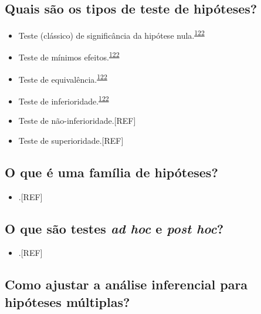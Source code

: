 \documentclass[
  a4paper,
]{book}
\providecommand{\tightlist}{%
  \setlength{\itemsep}{0pt}\setlength{\parskip}{0pt}}
\begin{document}
\hypertarget{quais-suxe3o-os-tipos-de-teste-de-hipuxf3teses}{%
\subsection{Quais são os tipos de teste de hipóteses?}\label{quais-suxe3o-os-tipos-de-teste-de-hipuxf3teses}}

\begin{itemize}
\item
  Teste (clássico) de significância da hipótese nula.\textsuperscript{\protect\hyperlink{ref-lakens2018}{122}}
\item
  Teste de mínimos efeitos.\textsuperscript{\protect\hyperlink{ref-lakens2018}{122}}
\item
  Teste de equivalência.\textsuperscript{\protect\hyperlink{ref-lakens2018}{122}}
\item
  Teste de inferioridade.\textsuperscript{\protect\hyperlink{ref-lakens2018}{122}}
\item
  Teste de não-inferioridade.{[}REF{]}
\item
  Teste de superioridade.{[}REF{]}
\end{itemize}

\hypertarget{o-que-uxe9-uma-famuxedlia-de-hipuxf3teses}{%
\subsection{O que é uma família de hipóteses?}\label{o-que-uxe9-uma-famuxedlia-de-hipuxf3teses}}

\begin{itemize}
\tightlist
\item
  .{[}REF{]}
\end{itemize}

\hypertarget{o-que-suxe3o-testes-ad-hoc-e-post-hoc}{%
\subsection{\texorpdfstring{O que são testes \emph{ad hoc} e \emph{post hoc}?}{O que são testes ad hoc e post hoc?}}\label{o-que-suxe3o-testes-ad-hoc-e-post-hoc}}

\begin{itemize}
\tightlist
\item
  .{[}REF{]}
\end{itemize}

\hypertarget{como-ajustar-a-anuxe1lise-inferencial-para-hipuxf3teses-muxfaltiplas}{%
\subsection{Como ajustar a análise inferencial para hipóteses múltiplas?}\label{como-ajustar-a-anuxe1lise-inferencial-para-hipuxf3teses-muxfaltiplas}}
\end{document}
